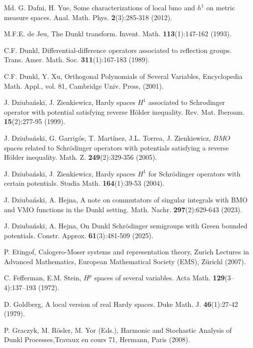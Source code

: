 \documentclass[11pt, reqno]{amsproc}
\theoremstyle{definition}
\theoremstyle{remark}
\numberwithin{equation}{section}
\begin{document}
\begin{thebibliography}{Md.}
G. Dafni, H. Yue, Some characterizations of local bmo and $h^1$ on metric measure spaces. Anal. Math. Phys. \textbf{2}(3):285-318 (2012).

 M.F.E. de Jeu, The Dunkl transform. Invent. Math. \textbf{113}(1):147-162 (1993).

 C.F. Dunkl, Differential-difference operators associated to reflection groups. Trans. Amer. Math. Soc. \textbf{311}(1):167-183 (1989). 

 C.F. Dunkl, Y. Xu, Orthogonal Polynomials of Several Variables, Encyclopedia Math. Appl., vol. 81, Cambridge Univ. Press, (2001).


 J. Dziuba\'nski, J. Zienkiewicz, Hardy spaces {$H^1$} associated to Schrodinger operator with potential satisfying reverse H\"older inequality. Rev. Mat. Iberoam. \textbf{15}(2):277-95 (1999).

J. Dziuba\'nski, G.  Garrig\'os,  T. Mart\'inez, J.L. Torrea,  J. Zienkiewicz,  $BMO$ spaces related to Schr\"odinger operators with potentials satisfying a reverse H\"older inequality. Math. Z.  \textbf{249}(2):329-356 (2005).


 J. Dziuba\'nski, J. Zienkiewicz, Hardy spaces {$H^1$} for {S}chr\"odinger operators with
certain potentials. Studia Math. \textbf{164}(1):39-53 (2004).

J. Dziuba\'nski, A. Hejna, A note on commutators of singular integrals with {BMO} and {VMO} functions in the {D}unkl setting. Math. Nachr. \textbf{297}(2):629-643 (2023).


 J. Dziuba\'nski, A. Hejna,
On {D}unkl {S}chr\"odinger semigroups with {G}reen bounded potentials. Constr. Approx. \textbf{61}(3):481-509 (2025). 


 P. Etingof, Calogero-Moser systems and representation theory, Zurich Lectures in Advanced
Mathematics, European Mathematical Society (EMS), Z\"urichl (2007).

C. Fefferman, E.M. Stein, $H^p$ spaces of several variables. Acta Math. \textbf{129}(3–4):137–193 (1972).


 D. Goldberg, A local version of real {H}ardy spaces. Duke Math. J. \textbf{46}(1):27-42 (1979).

 P. Graczyk, M. R\"osler, M. Yor (Eds.), Harmonic and Stochastic Analysis of Dunkl Processes,Travaux en cours 71, Hermann, Paris (2008).


\end{thebibliography}
\end{document}
